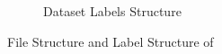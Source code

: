 \begin{figure}
\begin{subfigure}[][][t]{.37\textwidth}
      \label{fig:labelstructure}

      \caption{Dataset Labels Structure}
    \end{subfigure}

    \label{datasetstructure}
    \caption{File Structure and Label Structure of \textcite{aot_dataset}}
  \end{figure}

